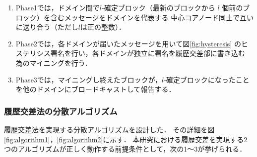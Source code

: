 \documentclass[a4paper,12pt]{jsarticle}
\begin{document}
\hspace{5mm}
%
\begin{enumerate}
\item Phase1では，ドメイン間で$l$-確定ブロック（最新のブロックから 
      $l$ 個前のブロック）を含むメッセージをドメインを代表する
      中心コアノード同士で互いに送り合う（ただし$l$は正の整数）．

\item Phase2では，各ドメインが届いたメッセージを用いて図\ref{fig:hysteresis}
      のヒステリシス署名を行い，各ドメインが独立に署名を履歴交差部に書き込む
      為のマイニングを行う．

\item Phase3では，マイニングし終えたブロックが，$l$-確定ブロックになったこと
      を他のドメインにブロードキャストして報告する．
\end{enumerate}
%
\hspace{5mm}

      \subsubsection{履歴交差法の分散アルゴリズム}

履歴交差法を実現する分散アルゴリズム\cite{manabe}を設計した．
その詳細を図 \ref{fig:algorithm1}，\ref{fig:algorithm2}に示す．
本研究における履歴交差を実現する2つのアルゴリズムが正しく動作する前提条件として，次の1〜3が挙げられる．
\end{document}
